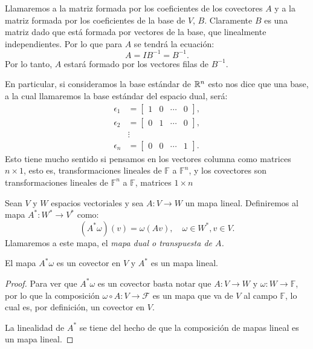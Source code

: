 \begin{example}
	Llamaremos a la matriz formada por los coeficientes de los covectores $A$ y a la matriz formada por los coeficientes de la base de $V$, $B$. Claramente $B$ es una matriz dado que está formada por vectores de la base, que linealmente independientes. Por lo que para $A$ se tendrá la ecuación:
	\[
		A = IB^{-1} = B^{-1}.
	\]
	Por lo tanto, $A$ estará formado por los vectores filas de $B^{-1}$.

	En particular, si consideramos la base estándar de $\mathbb{R}^n$ esto nos dice que una base, a la cual llamaremos la base estándar del espacio dual, será:
	\begin{align*}
		\epsilon_1 & = \begin{bmatrix} 1 & 0 & \cdots & 0\end{bmatrix}, \\
		\epsilon_2 & = \begin{bmatrix} 0 & 1 & \cdots & 0\end{bmatrix}, \\
		           & \vdots                                             \\
		\epsilon_n & = \begin{bmatrix} 0 & 0 & \cdots & 1\end{bmatrix}.
	\end{align*}
	Esto tiene mucho sentido si pensamos en los vectores columna como matrices $n \times 1$, esto es, transformaciones lineales de $\mathbb{F}$ a $\mathbb{F}^n$, y los covectores son transformaciones lineales de $\mathbb{F}^n$ a $\mathbb{F}$, matrices $1 \times n$
\end{example}

\begin{definition}
	Sean $V$ y $W$ espacios vectoriales y sea $A: V \to W$ un mapa lineal. Definiremos al mapa $A^*: W^* \to V^*$ como:
	\[(A^{*}\omega)(v) = \omega(Av), \quad \omega \in W^{*}, v \in V.\]
	Llamaremos a este mapa, el \it{mapa dual} o \it{transpuesta de $A$}.
\end{definition}

\begin{lemma}
	El mapa $A^{*}\omega$ es un covector en $V$ y $A^{*}$ es un mapa lineal.
\end{lemma}

\begin{proof}
	Para ver que $A^{*}\omega$ es un covector basta notar que $A: V \to W$ y $\omega: W \to \mathbb{F}$, por lo que la composición $\omega \circ A: V \to \mathcal{F}$ es un mapa que va de $V$ al campo $\mathbb{F}$, lo cual es, por definición, un covector en $V$.

	La linealidad de $A^{*}$ se tiene del hecho de que la composición de mapas lineal es un mapa lineal.
\end{proof}

